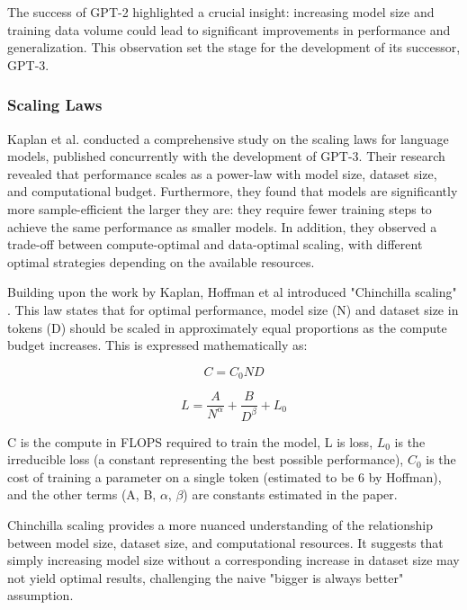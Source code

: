 \documentclass[a4paper, oneside]{discothesis}
\begin{document}
The success of GPT-2 highlighted a crucial insight: increasing model size and training data volume could lead to significant improvements in performance and generalization. This observation set the stage for the development of its successor, GPT-3.

\subsubsection{Scaling Laws}
Kaplan et al. \cite{kaplan2020scaling} conducted a comprehensive study on the scaling laws for language models, published concurrently with the development of GPT-3. Their research revealed that performance scales as a power-law with model size, dataset size, and computational budget. Furthermore, they found that models are significantly more sample-efficient the larger they are: they require fewer training steps to achieve the same performance as smaller models. In addition, they observed a trade-off between compute-optimal and data-optimal scaling, with different optimal strategies depending on the available resources.

Building upon the work by Kaplan, Hoffman et al introduced "Chinchilla scaling" \cite{hoffmann2022training}. This law states that for optimal performance, model size (N) and dataset size in tokens (D) should be scaled in approximately equal proportions as the compute budget increases. This is expressed mathematically as:

\begin{equation}
C = C_0ND
\end{equation}

\begin{equation}
L = \frac{A}{N^\alpha} + \frac{B}{D^\beta} + L_0
\end{equation}

C is the compute in FLOPS required to train the model, L is loss, $L_0$ is the irreducible loss (a constant representing the best possible performance), $C_0$ is the cost of training a parameter on a single token (estimated to be 6 by Hoffman), and the other terms (A, B, $\alpha$, $\beta$) are constants estimated in the paper.

Chinchilla scaling provides a more nuanced understanding of the relationship between model size, dataset size, and computational resources. It suggests that simply increasing model size without a corresponding increase in dataset size may not yield optimal results, challenging the naive "bigger is always better" assumption.
\end{document}
